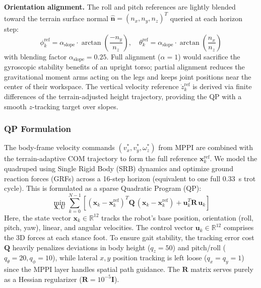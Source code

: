 \documentclass[letterpaper, 10 pt, conference]{ieeeconf}  %
\begin{document}
\textbf{Orientation alignment.} The roll and pitch references are lightly blended toward the terrain surface normal $\hat{\mathbf{n}} = (n_x, n_y, n_z)^T$ queried at each horizon step:
\begin{equation}
\phi_k^{\text{ref}} = \alpha_{\text{slope}} \cdot \arctan\!\left(\frac{-n_y}{n_z}\right), \quad \theta_k^{\text{ref}} = \alpha_{\text{slope}} \cdot \arctan\!\left(\frac{n_x}{n_z}\right) \label{eq:com_rpy}
\end{equation}
with blending factor $\alpha_{\text{slope}} = 0.25$. Full alignment ($\alpha = 1$) would sacrifice the gyroscopic stability benefits of an upright torso; partial alignment reduces the gravitational moment arms acting on the legs and keeps joint positions near the center of their workspace. The vertical velocity reference $\dot{z}_k^{\text{ref}}$ is derived via finite differences of the terrain-adjusted height trajectory, providing the QP with a smooth $z$-tracking target over slopes.

\subsubsection{QP Formulation}
The body-frame velocity commands $(v_x^*, v_y^*, \omega_z^*)$ from MPPI are combined with the terrain-adaptive COM trajectory to form the full reference $\mathbf{x}_k^{\text{ref}}$. We model the quadruped using Single Rigid Body (SRB) dynamics \cite{DiCarlo2018ConvexMPC} and optimize ground reaction forces (GRFs) across a 16-step horizon (equivalent to one full $0.33$~s trot cycle). This is formulated as a sparse Quadratic Program (QP):
\begin{equation}
\min_{\mathbf{X}, \mathbf{U}} \sum_{k=0}^{N-1} \left[(\mathbf{x}_k - \mathbf{x}_k^{\text{ref}})^T \mathbf{Q}\,(\mathbf{x}_k - \mathbf{x}_k^{\text{ref}}) + \mathbf{u}_k^T \mathbf{R}\,\mathbf{u}_k\right] \label{eq:qp_objective}
\end{equation}
Here, the state vector $\mathbf{x}_k \in \mathbb{R}^{12}$ tracks the robot's base position, orientation (roll, pitch, yaw), linear, and angular velocities. The control vector $\mathbf{u}_k \in \mathbb{R}^{12}$ comprises the 3D forces at each stance foot. To ensure gait stability, the tracking error cost $\mathbf{Q}$ heavily penalizes deviations in body height ($q_z=50$) and pitch/roll ($q_{\theta}=20, q_{\phi}=10$), while lateral $x,y$ position tracking is left loose ($q_x=q_y=1$) since the MPPI layer handles spatial path guidance. The $\mathbf{R}$ matrix serves purely as a Hessian regularizer ($\mathbf{R}=10^{-5}\mathbf{I}$).
\end{document}
